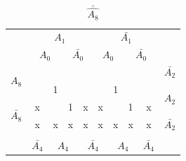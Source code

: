 \documentclass[a4paper,14pt]{article}
\begin{document}
\begin{table}[!htb]
\begin{minipage}{.5\linewidth}
		\caption{$\bar{\hat{A_8}}$}
\begin{tabular}{cccccccccc}
	& \multicolumn{4}{c}{$A_1$}                                                                         & \multicolumn{4}{c}{$\bar{A_1}$}                                                                   &                        \\
	& \multicolumn{2}{c}{$A_0$}                       & \multicolumn{2}{c}{$\bar{A_0}$}                 & \multicolumn{2}{c}{$A_0$}                       & \multicolumn{2}{c}{$\bar{A_0}$}                 &                        \\ \cline{2-9}
	\multicolumn{1}{c|}{\multirow{2}{*}{$A_8$}}       & \multicolumn{1}{c|}{}  & \multicolumn{1}{c|}{}  & \multicolumn{1}{c|}{}  & \multicolumn{1}{c|}{}  & \multicolumn{1}{c|}{}  & \multicolumn{1}{c|}{}  & \multicolumn{1}{c|}{}  & \multicolumn{1}{c|}{}  & $\bar{A_2}$            \\ \cline{2-9}
	\multicolumn{1}{c|}{}                             & \multicolumn{1}{c|}{}  & \multicolumn{1}{c|}{1} & \multicolumn{1}{c|}{}  & \multicolumn{1}{c|}{}  & \multicolumn{1}{c|}{}  & \multicolumn{1}{c|}{1} & \multicolumn{1}{c|}{}  & \multicolumn{1}{c|}{}  & \multirow{2}{*}{$A_2$} \\ \cline{2-9}
	\multicolumn{1}{c|}{\multirow{2}{*}{$\bar{A_8}$}} & \multicolumn{1}{c|}{x} & \multicolumn{1}{c|}{}  & \multicolumn{1}{c|}{1} & \multicolumn{1}{c|}{x} & \multicolumn{1}{c|}{x} & \multicolumn{1}{c|}{}  & \multicolumn{1}{c|}{1} & \multicolumn{1}{c|}{x} &                        \\ \cline{2-9}
	\multicolumn{1}{c|}{}                             & \multicolumn{1}{c|}{x} & \multicolumn{1}{c|}{x} & \multicolumn{1}{c|}{x} & \multicolumn{1}{c|}{x} & \multicolumn{1}{c|}{x} & \multicolumn{1}{c|}{x} & \multicolumn{1}{c|}{x} & \multicolumn{1}{c|}{x} & $\bar{A_2}$            \\ \cline{2-9}
	\\
	& $\bar{A_4}$            & \multicolumn{2}{c}{$A_4$}                       & \multicolumn{2}{c}{$\bar{A_4}$}                 & \multicolumn{2}{c}{$A_4$}                       & $\bar{A_4}$            &                       
\end{tabular}
	\end{minipage} 
\end{table}
\end{document}
